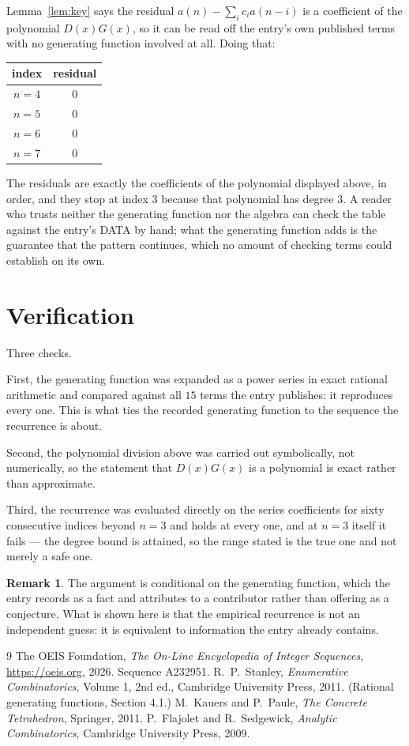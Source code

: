 \documentclass[11pt,a4paper]{article}
\theoremstyle{plain}
\theoremstyle{definition}
\newtheorem{remark}[theorem]{Remark}
\begin{document}
Lemma~\ref{lem:key} says the residual $a(n)-\sum_ic_ia(n-i)$ is a coefficient of the
polynomial $D(x)G(x)$, so it can be read off the entry's own published terms with no
generating function involved at all. Doing that:
\begin{center}
\begin{tabular}{cc}
index & residual \\ \hline
$n=4$ & $0$ \\
$n=5$ & $0$ \\
$n=6$ & $0$ \\
$n=7$ & $0$
\end{tabular}
\end{center}
The residuals are exactly the coefficients of the polynomial displayed above, in order, and
they stop at index $3$ because that polynomial has degree $3$. A reader who trusts
neither the generating function nor the algebra can check the table against the entry's DATA
by hand; what the generating function adds is the guarantee that the pattern continues, which
no amount of checking terms could establish on its own.

\section{Verification}

Three checks.

First, the generating function was expanded as a power series in exact rational arithmetic and
compared against all $15$ terms the entry publishes: it reproduces every one. This is
what ties the recorded generating function to the sequence the recurrence is about.

Second, the polynomial division above was carried out symbolically, not numerically, so the
statement that $D(x)G(x)$ is a polynomial is exact rather than approximate.

Third, the recurrence was evaluated directly on the series coefficients for sixty consecutive
indices beyond $n=3$ and holds at every one, and at $n=3$ itself it fails --- the
degree bound is attained, so the range stated is the true one and not merely a safe one.

\begin{remark}
The argument is conditional on the generating function, which the entry records as a fact and
attributes to a contributor rather than offering as a conjecture. What is shown here is that
the empirical recurrence is not an independent guess: it is equivalent to information the
entry already contains.
\end{remark}

\begin{thebibliography}{9}
 The OEIS Foundation, \emph{The On-Line Encyclopedia of Integer
Sequences}, \url{https://oeis.org}, 2026. Sequence A232951.
 R.~P.~Stanley, \emph{Enumerative Combinatorics}, Volume 1, 2nd ed.,
Cambridge University Press, 2011. (Rational generating functions, Section 4.1.)
 M.~Kauers and P.~Paule, \emph{The Concrete Tetrahedron}, Springer, 2011.
 P.~Flajolet and R.~Sedgewick, \emph{Analytic Combinatorics}, Cambridge
University Press, 2009.
\end{thebibliography}
\end{document}
